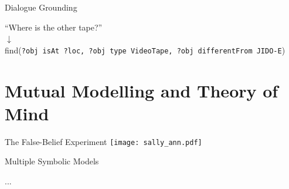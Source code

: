 \documentclass[handout,compress]{beamer}
\begin{document}


{
\begin{frame}{Dialogue Grounding}
    \centering

    \vspace*{2em}
    ``Where is the other tape?''\\
    $\downarrow$\\
    find({\tt\scriptsize ?obj isAt ?loc, ?obj type VideoTape, ?obj differentFrom JIDO-E})
\end{frame}
}


\section{Mutual Modelling and Theory of Mind}


\begin{frame}{The False-Belief Experiment}
    \centering
    \texttt{[image: sally\_ann.pdf]}

\end{frame}


{
\begin{frame}{Multiple Symbolic Models}
        \begin{multicols}{2}
            \begin{figure}
                \resizebox{0.33\textwidth}{!}{\usebox{\ontoinstance}}
            \end{figure}
            \begin{figure}
                \resizebox{0.33\textwidth}{!}{\usebox{\ontoinstance}}
            \end{figure}
            \begin{figure}
                \resizebox{0.33\textwidth}{!}{\usebox{\ontoinstance}}
            \end{figure}
            {\vspace*{1.5cm}\hspace*{2.5cm}\huge...}
        \end{multicols}
\end{frame}
}
\end{document}

